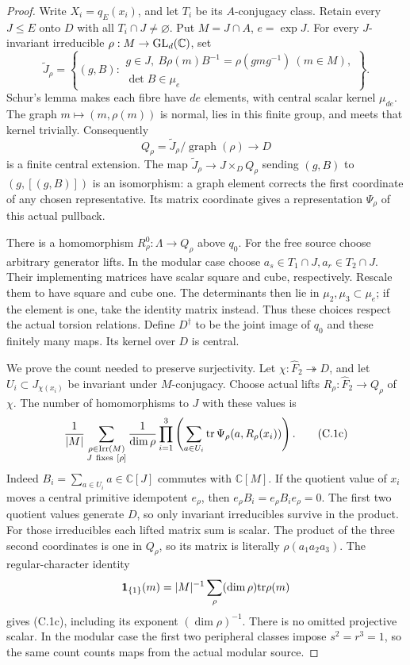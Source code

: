 \begin{proof}
Write \(X_i=q_E(x_i)\), and let \(T_i\) be its \(A\)-conjugacy class.
Retain every \(J\leq E\) onto \(D\) with all \(T_i\cap J\ne\varnothing\).
Put \(M=J\cap A\), \(e=\exp J\). For every \(J\)-invariant irreducible
\(\rho:M\to{\rm GL}_d(\mathbb C)\), set
\[
 \widetilde J_\rho=
 \left\{(g,B):
 \begin{array}{l}
 g\in J,\ B\rho(m)B^{-1}=\rho(gmg^{-1})\ (m\in M),\\
 \det B\in\mu_e
 \end{array}\right\}.
 \tag{C.1a}
\]
Schur's lemma makes each fibre have \(de\) elements, with central
scalar kernel \(\mu_{de}\). The graph \(m\mapsto(m,\rho(m))\) is
normal, lies in this finite group, and meets that kernel trivially.
Consequently
\[
 Q_\rho=\widetilde J_\rho/\operatorname{graph}(\rho)\to D
 \tag{C.1b}
\]
is a finite central extension. The map
\(\widetilde J_\rho\to J\times_DQ_\rho\) sending
\((g,B)\) to \((g,[(g,B)])\) is an isomorphism: a graph element
corrects the first coordinate of any chosen representative.
Its matrix coordinate gives a representation \(\Psi_\rho\)
of this actual pullback.

There is a homomorphism \(R_\rho^0:\Lambda\to Q_\rho\) above \(q_0\).
For the free source choose arbitrary generator lifts. In the modular
case choose \(a_s\in T_1\cap J,a_r\in T_2\cap J\).
Their implementing matrices have scalar square and cube, respectively.
Rescale them to have square and cube one. The determinants then lie
in \(\mu_2,\mu_3\subset\mu_e\); if the element is one, take the
identity matrix instead. Thus these choices respect the actual
torsion relations. Define \(D^\dagger\) to be the joint image of
\(q_0\) and these finitely many maps. Its kernel over \(D\) is central.

We prove the count needed to preserve surjectivity. Let
\(\chi:\widehat F_2\twoheadrightarrow D\), and let
\(U_i\subset J_{\chi(x_i)}\) be invariant under \(M\)-conjugacy.
Choose actual lifts \(R_\rho:\widehat F_2\to Q_\rho\) of \(\chi\).
The number of homomorphisms to \(J\) with these values is
\[
 \frac1{|M|}
 \sum_{\substack{\rho\in{\rm Irr}(M)\\J\ {\rm fixes}\ [\rho]}}
 \frac1{\dim\rho}
 \prod_{i=1}^3\left(
  \sum_{a\in U_i}{\rm tr}\,\Psi_\rho(a,R_\rho(x_i))\right).
 \tag{C.1c}
\]
Indeed \(B_i=\sum_{a\in U_i}a\in\mathbb C[J]\) commutes with
\(\mathbb C[M]\). If the quotient value of \(x_i\) moves a central
primitive idempotent \(e_\rho\), then
\(e_\rho B_i=e_\rho B_ie_\rho=0\). The first two quotient values
generate \(D\), so only invariant irreducibles survive in the product.
For those irreducibles each lifted matrix sum is scalar.
The product of the three second coordinates is one in \(Q_\rho\),
so its matrix is literally \(\rho(a_1a_2a_3)\).
The regular-character identity
\[
 {\bf1}_{\{1\}}(m)=|M|^{-1}
       \sum_\rho(\dim\rho){\rm tr}\rho(m)
\]
gives (C.1c), including its exponent \((\dim\rho)^{-1}\).
There is no omitted projective scalar. In the modular case the first
two peripheral classes impose \(s^2=r^3=1\), so the same count
counts maps from the actual modular source.


\end{proof}
